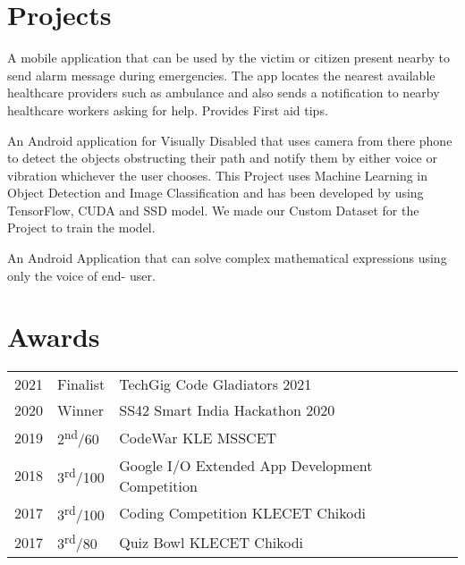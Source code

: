 \documentclass[]{deedy-resume-openfont}
\begin{document}
\begin{minipage}[t]{0.66\textwidth}
\section{Projects}
A mobile application that can be used by the victim or
citizen present nearby to send alarm message during emergencies. The app locates the
nearest available healthcare providers such as ambulance and also sends a notification to nearby healthcare workers asking for help. Provides First aid tips.
\sectionsep

An Android application for Visually Disabled that uses camera from there phone to detect the objects obstructing
their path and notify them by either voice or vibration whichever the user chooses. This Project uses
Machine Learning in Object Detection and Image Classification and has been developed by using
TensorFlow, CUDA and SSD model. We made our Custom Dataset for the Project to train the model.
\sectionsep

An Android Application that can solve complex mathematical expressions using only the voice of end-
user.
\sectionsep


\section{Awards} 
\begin{tabular}{rll}
2021	     & Finalist  & TechGig Code Gladiators 2021\\
2020	     & Winner  & SS42 Smart India Hackathon 2020\\
2019	     & 2\textsuperscript{nd}/60  & CodeWar KLE MSSCET \\
2018     & 3\textsuperscript{rd}/100 & Google I/O Extended App Development Competition  \\
2017     & 3\textsuperscript{rd}/100 & Coding Competition KLECET Chikodi \\
2017     & 3\textsuperscript{rd}/80 & Quiz Bowl KLECET Chikodi \\
\end{tabular}
\sectionsep

\end{minipage} 
\end{document}
